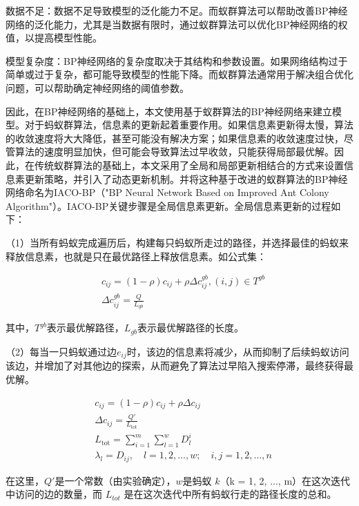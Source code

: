 \documentclass[bwprint]{gmcmthesis}
\begin{document}
数据不足：数据不足导致模型的泛化能力不足。而蚁群算法可以帮助改善BP神经网络的泛化能力，尤其是当数据有限时，通过蚁群算法可以优化BP神经网络的权值，以提高模型性能。

模型复杂度：BP神经网络的复杂度取决于其结构和参数设置。如果网络结构过于简单或过于复杂，都可能导致模型的性能下降。而蚁群算法通常用于解决组合优化问题，可以帮助确定神经网络的阈值参数。

因此，在BP神经网络的基础上，本文使用基于蚁群算法的BP神经网络来建立模型。对于蚂蚁群算法，信息素的更新起着重要作用。如果信息素更新得太慢，算法的收敛速度将大大降低，甚至可能没有解决方案；如果信息素的收敛速度过快，尽管算法的速度明显加快，但可能会导致算法过早收敛，只能获得局部最优解。因此，在传统蚁群算法的基础上，本文采用了全局和局部更新相结合的方式来设置信息素更新策略，并引入了动态更新机制。并将这种基于改进的蚁群算法的BP神经网络命名为IACO-BP（"BP Neural Network Based on Improved Ant Colony Algorithm"）。IACO-BP关键步骤是全局信息素更新。全局信息素更新的过程如下：

（1）当所有蚂蚁完成遍历后，构建每只蚂蚁所走过的路径，并选择最佳的蚂蚁来释放信息素，也就是只在最优路径上释放信息素。如公式集：


\begin{equation}
\begin{aligned}
&c_{ij}=(1-\rho)c_{ij}+\rho\Delta c_{ij}^{gb},(i,j)\in T^{gb} \\
&\Delta c_{ij}^{gb}=\frac{Q}{L_{gb}} 
\end{aligned}
\end{equation}


\noindent 其中，$T^{gb}$表示最优解路径，$L_{gb}$表示最优解路径的长度。

（2）每当一只蚂蚁通过边$e_{ij}$时，该边的信息素将减少，从而抑制了后续蚂蚁访问该边，并增加了对其他边的探索，从而避免了算法过早陷入搜索停滞，最终获得最优解。

\begin{equation}
\begin{aligned}
&c_{ij} = (1-\rho)c_{ij} + \rho\Delta c_{ij} \\
&\Delta c_{ij} = \frac{Q'}{L_{\text{tot}}} \\
&L_{\text{tot}} = \sum_{i=1}^m\sum_{l=1}^w D_l^i \\
&\lambda_l = D_{ij}, \quad l=1,2,\ldots,w; \quad i,j=1,2,\ldots,n
\end{aligned}
\end{equation}

在这里，${Q'}$是一个常数（由实验确定），$w$是蚂蚁 $k$（k = 1, 2, ..., m）在这次迭代中访问的边的数量，而 $L_{tot}$ 是在这次迭代中所有蚂蚁行走的路径长度的总和。
\end{document}
